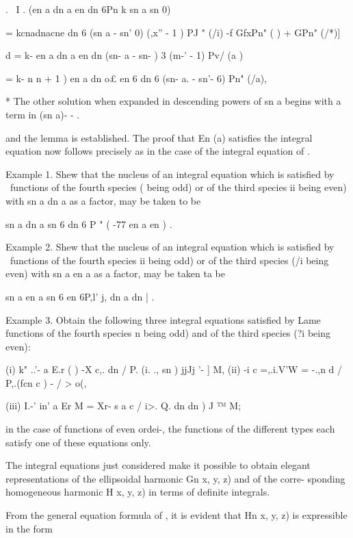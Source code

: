 {{{{{{{{. \ I . (en a dn a en dn 6Pn k sn a sn 0)\

= kcnadnacne dn 6 (sn a - sn' 0) (,x'' - 1 ) PJ " (/i) -f GfxPn" ( ) +
GPn" (/*)]

d = k- en a dn a en dn (sn- a - sn- ) 3 (m-' - 1) Pv/ (a )

= k- n n + 1 ) en a dn o£ en 6 dn 6 (sn- a. - sn'- 6) Pn" (/a),

* The other solution when expanded in descending powers of sn a begins
with a term in (sn a)- - .

%
%

and the lemma is established. The proof that En (a) satisfies the
integral equation now follows precisely as in the case of the integral
equation of .

Example 1. Shew that the nucleus of an integral equation which is
satisfied by \Lame\ functions of the fourth species ( being odd) or of
the third species ii being even) with sn a dn a as a factor, may be
taken to be

sn a dn a sn 6 dn 6 P " ( -77 en a en ) .

Example 2. Shew that the nucleus of an integral equation which is
satisfied by \Lame\ functions of the fourth species ii being odd) or of
the third species (/i being even) with sn a en a as a factor, may be
taken ta be

sn a en a sn 6 en 6P,l' j, dn a dn | .

Example 3. Obtain the following three integral equations satisfied by
Lame functions of the fourth species n being odd) and of the third
species (?i being even):

(i) k" ..'- a E.r ( ) -X c,. dn / P. (i. ., sn ) jjJj '- ] M, (ii) -i
c =,.i.V'W = -.,n d / P,.(fcn c ) - / > o(,

(iii) I.-' in' a Er M = Xr- s a c / i>. Q. dn dn ) J ™ M;

in the case of functions of even ordei-, the functions of the
different types each satisfy one of these equations only.


The integral equations just considered make it possible to obtain
elegant representations of the ellipsoidal harmonic Gn x, y, z) and of
the corre- sponding homogeneous harmonic H x, y, z) in terms of
definite integrals.

From the general equation formula of , it is evident that Hn x,
y, z) is expressible in the form

}}}}}}}}
